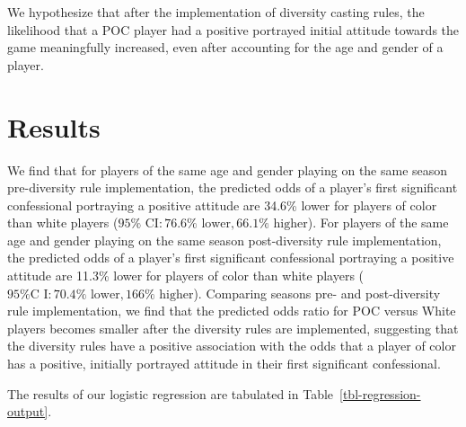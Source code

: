 \documentclass[
  letterpaper,
  DIV=11,
  numbers=noendperiod,
  oneside]{scrartcl}
\begin{document}
We hypothesize that after the implementation of diversity casting rules,
the likelihood that a POC player had a positive portrayed initial
attitude towards the game meaningfully increased, even after accounting
for the age and gender of a player.

\hypertarget{results}{%
\section{Results}\label{results}}

We find that for players of the same age and gender playing on the same
season pre-diversity rule implementation, the predicted odds of a
player's first significant confessional portraying a positive attitude
are 34.6\% lower for players of color than white players
(\(95\% \text{ CI}: 76.6\% \text{ lower}, 66.1\% \text{ higher}\)). For
players of the same age and gender playing on the same season
post-diversity rule implementation, the predicted odds of a player's
first significant confessional portraying a positive attitude are 11.3\%
lower for players of color than white players
(\(95\% \text{C I}: 70.4\% \text{ lower}, 166\% \text{ higher}\)).
Comparing seasons pre- and post-diversity rule implementation, we find
that the predicted odds ratio for POC versus White players becomes
smaller after the diversity rules are implemented, suggesting that the
diversity rules have a positive association with the odds that a player
of color has a positive, initially portrayed attitude in their first
significant confessional.

The results of our logistic regression are tabulated in
Table~\ref{tbl-regression-output}.
\end{document}

